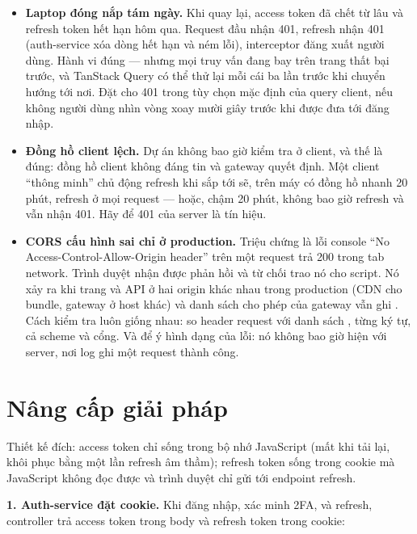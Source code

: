 \begin{itemize}
  \item \textbf{Laptop đóng nắp tám ngày.} Khi quay lại, access token
  đã chết từ lâu và refresh token hết hạn hôm qua. Request đầu nhận
  401, refresh nhận 401 (auth-service xóa dòng hết hạn và ném lỗi),
  interceptor đăng xuất người dùng. Hành vi đúng --- nhưng mọi truy
  vấn đang bay trên trang thất bại trước, và TanStack Query có thể thử
  lại mỗi cái ba lần trước khi chuyển hướng tới nơi. Đặt
   cho 401 trong tùy chọn mặc định của query client,
  nếu không người dùng nhìn vòng xoay mười giây trước khi được đưa tới
  đăng nhập.
  \item \textbf{Đồng hồ client lệch.} Dự án không bao giờ kiểm tra
   ở client, và thế là đúng: đồng hồ client không đáng tin
  và gateway quyết định. Một client ``thông minh'' chủ động refresh khi
   sắp tới sẽ, trên máy có đồng hồ nhanh 20 phút, refresh ở
  mọi request --- hoặc, chậm 20 phút, không bao giờ refresh và vẫn
  nhận 401. Hãy để 401 của server là tín hiệu.
  \item \textbf{CORS cấu hình sai chỉ ở production.} Triệu chứng là lỗi
  console ``No Access-Control-Allow-Origin header'' trên một request
  trả 200 trong tab network. Trình duyệt nhận được phản hồi và từ chối
  trao nó cho script. Nó xảy ra khi trang và API ở hai origin khác nhau
  trong production (CDN cho bundle, gateway ở host khác) và danh sách
  cho phép của gateway vẫn ghi . Cách kiểm tra luôn
  giống nhau: so header request  với danh sách
  , từng ký tự, cả scheme và cổng. Và để ý hình
  dạng của lỗi: nó không bao giờ hiện với server, nơi log ghi một
  request thành công.
\end{itemize}

\section{Nâng cấp giải pháp}
\label{sec:fe-enhance}

Thiết kế đích: access token chỉ sống trong bộ nhớ JavaScript (mất khi
tải lại, khôi phục bằng một lần refresh âm thầm); refresh token sống
trong cookie  mà JavaScript không đọc được và trình
duyệt chỉ gửi tới endpoint refresh.

\textbf{1. Auth-service đặt cookie.} Khi đăng nhập, xác minh 2FA, và
refresh, controller trả access token trong body và refresh token trong
cookie:

